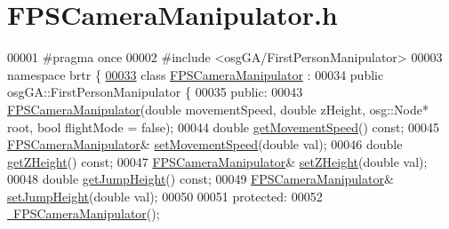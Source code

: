 \hypertarget{_f_p_s_camera_manipulator_8h_source}{\section{F\+P\+S\+Camera\+Manipulator.\+h}
\label{_f_p_s_camera_manipulator_8h_source}
}

\begin{DoxyCode}
00001 \textcolor{preprocessor}{#pragma once}
00002 \textcolor{preprocessor}{#include <osgGA/FirstPersonManipulator>}
00003 \textcolor{keyword}{namespace }brtr \{
\hypertarget{_f_p_s_camera_manipulator_8h_source_l00033}{}\hyperlink{classbrtr_1_1_f_p_s_camera_manipulator}{00033}     \textcolor{keyword}{class }\hyperlink{classbrtr_1_1_f_p_s_camera_manipulator}{FPSCameraManipulator} :
00034         \textcolor{keyword}{public} osgGA::FirstPersonManipulator \{
00035     \textcolor{keyword}{public}:
00043         \hyperlink{classbrtr_1_1_f_p_s_camera_manipulator_aaf8bf3f6db925ba6c7d4a3157edcede3}{FPSCameraManipulator}(\textcolor{keywordtype}{double} movementSpeed, \textcolor{keywordtype}{double} zHeight, osg::Node* root, \textcolor{keywordtype}{
      bool} flightMode = \textcolor{keyword}{false});
00044         \textcolor{keywordtype}{double} \hyperlink{classbrtr_1_1_f_p_s_camera_manipulator_a3c576fd94a834b4712c30280ebc38763}{getMovementSpeed}() \textcolor{keyword}{const};
00045         \hyperlink{classbrtr_1_1_f_p_s_camera_manipulator}{FPSCameraManipulator}& \hyperlink{classbrtr_1_1_f_p_s_camera_manipulator_a778a95c8fa5c22d9c5e3bdde5e8c6591}{setMovementSpeed}(\textcolor{keywordtype}{double} val);
00046         \textcolor{keywordtype}{double} \hyperlink{classbrtr_1_1_f_p_s_camera_manipulator_ad564a29e30a95676a64b06160ba9e6ea}{getZHeight}() \textcolor{keyword}{const};
00047         \hyperlink{classbrtr_1_1_f_p_s_camera_manipulator}{FPSCameraManipulator}& \hyperlink{classbrtr_1_1_f_p_s_camera_manipulator_a71f558339f33edf1fa8cf81faf5914aa}{setZHeight}(\textcolor{keywordtype}{double} val);
00048         \textcolor{keywordtype}{double} \hyperlink{classbrtr_1_1_f_p_s_camera_manipulator_a409f00bd591ea3f847319794d4e0f15d}{getJumpHeight}() \textcolor{keyword}{const};
00049         \hyperlink{classbrtr_1_1_f_p_s_camera_manipulator}{FPSCameraManipulator}& \hyperlink{classbrtr_1_1_f_p_s_camera_manipulator_a8bf29fb4cf8f0d8842b7b0ac798e23cb}{setJumpHeight}(\textcolor{keywordtype}{double} val);
00050 
00051     \textcolor{keyword}{protected}:
00052         \hyperlink{classbrtr_1_1_f_p_s_camera_manipulator_a9f18b06a1f730f39da8fb7bdf960c3a9}{~FPSCameraManipulator}();

\end{DoxyCode}
